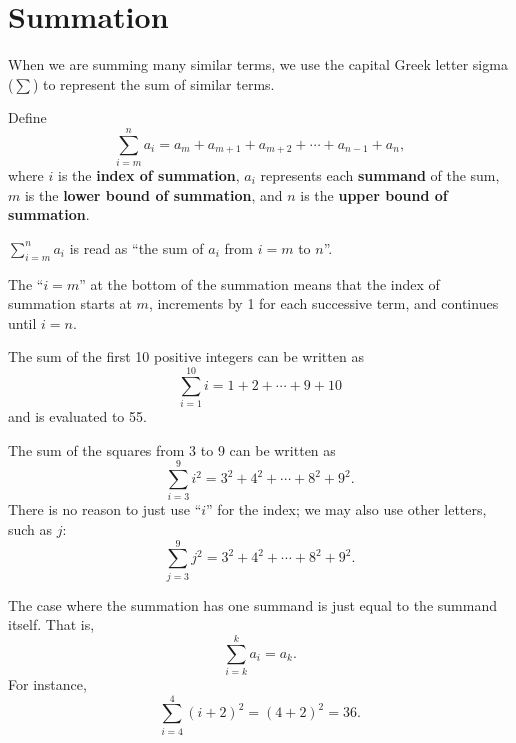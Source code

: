 \section{Summation}
When we are summing many similar terms, we use the capital Greek letter sigma ($\sum$) to represent the sum of similar terms. 
\begin{definition}
    Define
    \[
        \sum_{i=m}^{n}a_i = a_m + a_{m+1} + a_{m+2} + \cdots + a_{n-1} + a_n,
    \]
    where $i$ is the \textbf{index of summation}, $a_i$ represents each \textbf{summand} of the sum, $m$ is the \textbf{lower bound of summation}, and $n$ is the \textbf{upper bound of summation}.
\end{definition}
\begin{remark}
    $\displaystyle \sum_{i=m}^{n}a_i$ is read as ``the sum of $a_i$ from $i=m$ to $n$''.
\end{remark}
\begin{remark}
    The ``$i = m$'' at the bottom of the summation means that the index of summation starts at $m$, increments by 1 for each successive term, and continues until $i = n$.
\end{remark}

\begin{example}
    The sum of the first 10 positive integers can be written as
    \[
        \sum_{i=1}^{10}i = 1 + 2 + \cdots + 9 + 10
    \]
    and is evaluated to 55.
\end{example}

\begin{example}
    The sum of the squares from 3 to 9 can be written as
    \[
        \sum_{i=3}^{9}i^2 = 3^2 + 4^2 + \cdots + 8^2 + 9^2.
    \]
    There is no reason to just use ``$i$'' for the index; we may also use other letters, such as $j$:
    \[
        \sum_{j=3}^{9}j^2 = 3^2 + 4^2 + \cdots + 8^2 + 9^2.
    \]
\end{example}

\begin{example}
    The case where the summation has one summand is just equal to the summand itself. That is,
    \[
        \sum_{i=k}^{k}a_i = a_k.
    \]
    For instance,
    \[
        \sum_{i=4}^4(i+2)^2 = (4+2)^2 = 36.
    \]
\end{example}

